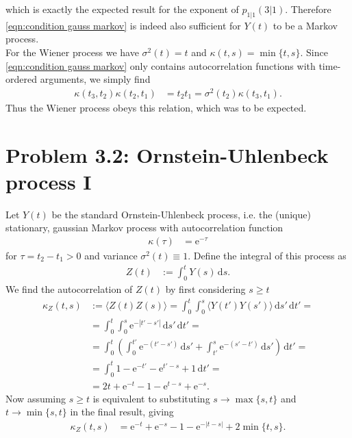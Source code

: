 \documentclass[english, parskip=full]{scrartcl}
\newcommand{\bra}{}
\newcommand{\intx}{}
\newcommand{\kla}{}
\newcommand{\e}{\text{e}}
\begin{document}
which is exactly the expected result for the exponent of $p_{1|1}(3|1)$.
Therefore \eqref{eqn:condition gauss markov} is indeed also sufficient for $Y(t)$ to be a Markov process.\\
For the Wiener process we have $\sigma^2(t) = t$ and $\kappa (t,s) = \min\{t,s\}$.
Since \eqref{eqn:condition gauss markov} only contains autocorrelation functions with time-ordered arguments, we simply find
\begin{align}
\kappa(t_3,t_2)\kappa(t_2,t_1) &= t_2t_1 = \sigma^2(t_2)\kappa(t_3,t_1).
\end{align}  
Thus the Wiener process obeys this relation, which was to be expected.
\newpage


\section*{Problem 3.2: Ornstein-Uhlenbeck process I}
Let $Y(t)$ be the standard Ornstein-Uhlenbeck process, i.e.
the (unique) stationary, gaussian Markov process with autocorrelation function
\begin{align}
\kappa(\tau) &= \e^{-\tau}
\end{align}
for $\tau = t_2 - t_1 > 0$ and variance $\sigma^2(t)\equiv 1$. 
Define the integral of this process as
\begin{align}
Z(t) &:= \intx\int_{0}^{t}Y(s)\, \mathrm{d}s.
\end{align}
We find the autocorrelation of $Z(t)$ by first considering $s\ge t$
\begin{align}
\kappa_Z(t,s) &:= \bra\langle Z(t)Z(s) \rangle = \intx\int_{0}^{t}\intx\int_{0}^{s}\bra\langle Y(t')Y(s') \rangle\, \mathrm{d}s'\, \mathrm{d}t' = \\
&= \intx\int_{0}^{t}\intx\int_{0}^{s}\e^{-|t'-s'|}\, \mathrm{d}s'\, \mathrm{d}t' = \\
&=\intx\int_{0}^{t}\kla\left( \intx\int_{0}^{t'}\e^{-(t'-s')}\, \mathrm{d}s' + \intx\int_{t'}^{s}\e^{-(s'-t')}\, \mathrm{d}s' \right)\, \mathrm{d}t' = \\
&= \intx\int_{0}^{t} 1 - \e^{-t'} - \e^{t'-s} + 1\, \mathrm{d}t' = \\
&= 2t + \e^{-t} - 1 - \e^{t-s} + \e^{-s}.
\end{align}
Now assuming $s\ge t$ is equivalent to substituting $s\rightarrow \max\{s,t\}$ and $t\rightarrow\min\{s,t\}$ in the final result, giving
\begin{align}
\kappa_Z(t,s) &= \e^{-t} + \e^{-s} - 1 - \e^{-|t-s|} + 2\min\{t,s\}.
\end{align}
\end{document}
